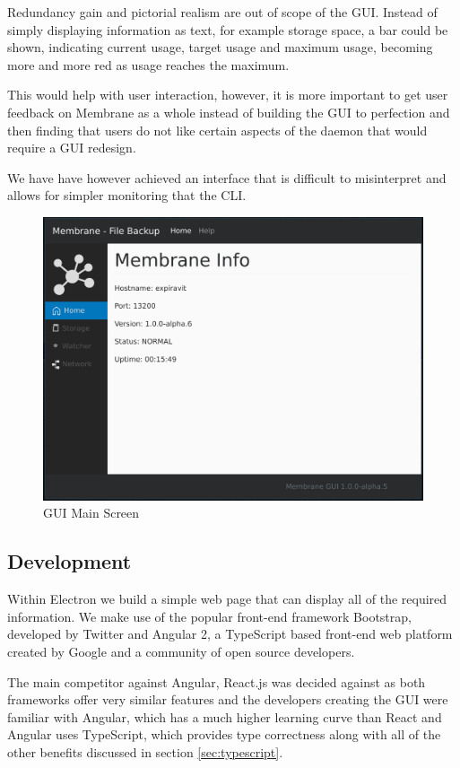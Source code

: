 \documentclass[11pt, a4paper, twoside]{report}
\begin{document}
Redundancy gain and pictorial realism are out of scope of the GUI. Instead of simply displaying information as text, for example storage space, a bar could be shown, indicating current usage, target usage and maximum usage, becoming more and more red as usage reaches the maximum.

This would help with user interaction, however, it is more important to get user feedback on Membrane as a whole instead of building the GUI to perfection and then finding that users do not like certain aspects of the daemon that would require a GUI redesign. 

We have have however achieved an interface that is difficult to misinterpret and allows for simpler monitoring that the CLI.

\begin{figure}
 \centering
 \includegraphics[width=\textwidth]{gui-main}
 \caption{GUI Main Screen}
 \label{fig:gui-main}
\end{figure}

\subsection{Development}

Within Electron we build a simple web page that can display all of the required information. We make use of the popular front-end framework Bootstrap, developed by Twitter and Angular 2, a TypeScript based front-end web platform created by Google and a community of open source developers.

The main competitor against Angular, React.js was decided against as both frameworks offer very similar features and the developers creating the GUI were familiar with Angular, which has a much higher learning curve than React \citep{house2016ng2react} and Angular uses TypeScript, which provides type correctness along with all of the other benefits discussed in section \ref{sec:typescript}.
\end{document}
